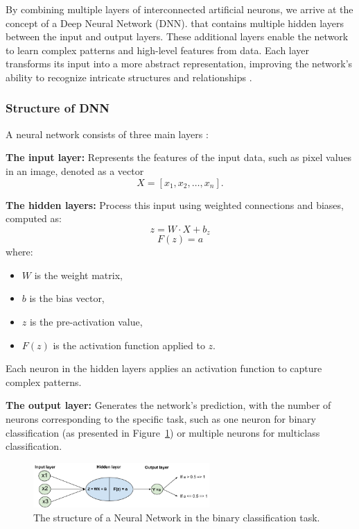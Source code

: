 By combining multiple layers of interconnected artificial neurons, we arrive at the concept of a Deep Neural Network (DNN). \parencite{A DNN is a neural network} that contains multiple hidden layers between the input and output layers. These additional layers enable the network to learn complex patterns and high-level features from data. Each layer transforms its input into a more abstract representation, improving the network’s ability to recognize intricate structures and relationships \parencite{li2021water}.
\subsubsection{Structure of DNN}
A neural network consists of three main layers \parencite{ren2023review}:

\noindent
\textbf{The input layer:} Represents the features of the input data, such as pixel values in an image, denoted as a vector 
\[
X = [x_1, x_2, \dots, x_n].
\]

\noindent
\textbf{The hidden layers:} Process this input using weighted connections and biases, computed as:
\[
z = W \cdot X + b_z \tag{1}
\]
\[
F(z) = a \tag{2}
\]
where:
\begin{itemize}
    \item $W$ is the weight matrix,
    \item $b$ is the bias vector,
    \item $z$ is the pre-activation value,
    \item $F(z)$ is the activation function applied to $z$.
\end{itemize}

Each neuron in the hidden layers applies an activation function to capture complex patterns.

\noindent
\textbf{The output layer:} Generates the network's prediction, with the number of neurons corresponding to the specific task, such as one neuron for binary classification (as presented in Figure~\ref{fig:figure02}) or multiple neurons for multiclass classification.



\begin{figure}[H] %
    \centering
    \includegraphics[width=0.6\textwidth]{chapters/chapter1/images/Figure02.png}
    \caption{The structure of a Neural Network in the binary classification task.}
    \label{fig:figure02}
\end{figure}

